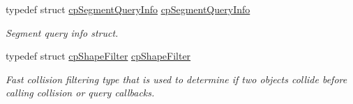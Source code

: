 \begin{DoxyCompactItemize}
typedef struct \hyperlink{structcpSegmentQueryInfo}{cp\+Segment\+Query\+Info} \hyperlink{group__cpShape_gadebeb6b5e42d369df368fd220aacd7e8}{cp\+Segment\+Query\+Info}
\begin{DoxyCompactList}\small\item\em Segment query info struct. \end{DoxyCompactList}\item 
\mbox{\label{group__cpShape_gaa85aa81b58edce2acc7e06316d11875c}} 
typedef struct \hyperlink{structcpShapeFilter}{cp\+Shape\+Filter} \hyperlink{group__cpShape_gaa85aa81b58edce2acc7e06316d11875c}{cp\+Shape\+Filter}
\begin{DoxyCompactList}\small\item\em Fast collision filtering type that is used to determine if two objects collide before calling collision or query callbacks. \end{DoxyCompactList}\end{DoxyCompactItemize}

